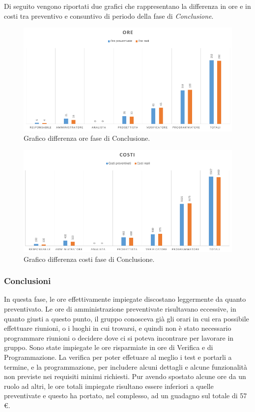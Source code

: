 \documentclass[a4paper]{article}
\begin{document}
				Di seguito vengono riportati due grafici che rappresentano la differenza in ore e in costi tra preventivo e consuntivo di periodo della 
				fase di \emph{Conclusione}.
				\begin{figure}[H]
					\centering
					\includegraphics[width=\textwidth]{diff_h_c}
					\caption{Grafico differenza ore fase di Conclusione.}
				\end{figure}
				\begin{figure}[H]
					\centering
					\includegraphics[width=\textwidth]{diff_c_c}
					\caption{Grafico differenza costi fase di Conclusione.}
				\end{figure}
				
				\subsubsection{Conclusioni}
					In questa fase, le ore effettivamente impiegate discostano leggermente da quanto preventivato. Le ore di amministrazione preventivate 
					risultavano eccessive, in quanto giusti a questo punto, il gruppo conosceva già gli orari in cui era possibile effettuare riunioni, o i 
					luoghi in cui trovarsi, e quindi non è stato necessario programmare riunioni o decidere dove ci si poteva incontrare per lavorare in gruppo.
					Sono state impiegate le ore risparmiate in ore di Verifica e di Programmazione. La verifica per poter effetuare al meglio i test e portarli 
					a termine, e la programmazione, per includere alcuni dettagli e alcune funzionalità non previste nei requisiti minimi richiesti.
					Pur avendo spostato alcune ore da un ruolo ad altri, le ore totali impiegate risultano essere inferiori a quelle preventivate e questo ha 
					portato, nel complesso, ad un guadagno sul totale di 57 \euro .
\end{document}
